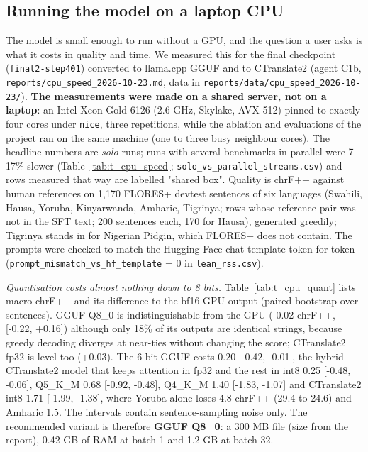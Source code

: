 \subsection{Running the model on a laptop CPU}\label{running-the-model-on-a-laptop-cpu}

The model is small enough to run without a GPU, and the question a user asks is what it costs in quality and time. We measured this for the final checkpoint (\texttt{final2-step401}) converted to llama.cpp GGUF and to CTranslate2 (agent C1b, \texttt{reports/cpu\_speed\_2026-10-23.md}, data in \texttt{reports/data/cpu\_speed\_2026-10-23/}). \textbf{The measurements were made on a shared server, not on a laptop}: an Intel Xeon Gold 6126 (2.6 GHz, Skylake, AVX-512) pinned to exactly four cores under \texttt{nice}, three repetitions, while the ablation and evaluations of the project ran on the same machine (one to three busy neighbour cores). The headline numbers are \emph{solo} runs; runs with several benchmarks in parallel were 7-17\% slower (Table~\ref{tab:t_cpu_speed}; \texttt{solo\_vs\_parallel\_streams.csv}) and rows measured that way are labelled "shared box". Quality is chrF++ against human references on 1,170 FLORES+ devtest sentences of six languages (Swahili, Hausa, Yoruba, Kinyarwanda, Amharic, Tigrinya; rows whose reference pair was not in the SFT text; 200 sentences each, 170 for Hausa), generated greedily; Tigrinya stands in for Nigerian Pidgin, which FLORES+ does not contain. The prompts were checked to match the Hugging Face chat template token for token (\texttt{prompt\_mismatch\_vs\_hf\_template} = 0 in \texttt{lean\_rss.csv}).

\emph{Quantisation costs almost nothing down to 8 bits.} Table~\ref{tab:t_cpu_quant} lists macro chrF++ and its difference to the bf16 GPU output (paired bootstrap over sentences). GGUF Q8\_0 is indistinguishable from the GPU (-0.02 chrF++, {[}-0.22, +0.16{]}) although only 18\% of its outputs are identical strings, because greedy decoding diverges at near-ties without changing the score; CTranslate2 fp32 is level too (+0.03). The 6-bit GGUF costs 0.20 {[}-0.42, -0.01{]}, the hybrid CTranslate2 model that keeps attention in fp32 and the rest in int8 0.25 {[}-0.48, -0.06{]}, Q5\_K\_M 0.68 {[}-0.92, -0.48{]}, Q4\_K\_M 1.40 {[}-1.83, -1.07{]} and CTranslate2 int8 1.71 {[}-1.99, -1.38{]}, where Yoruba alone loses 4.8 chrF++ (29.4 to 24.6) and Amharic 1.5. The intervals contain sentence-sampling noise only. The recommended variant is therefore \textbf{GGUF Q8\_0}: a 300 MB file (size from the report), 0.42 GB of RAM at batch 1 and 1.2 GB at batch 32.

